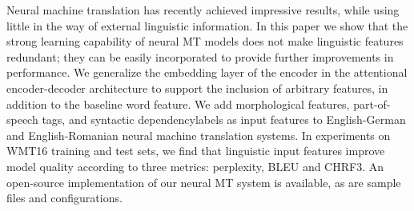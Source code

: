 Neural machine translation has recently achieved impressive results, while using little in the way of external linguistic information. In this paper we show that the strong learning capability of neural MT models does not make linguistic features redundant; they can be easily incorporated to provide further improvements in performance. We generalize the embedding layer of the encoder in the attentional encoder-decoder architecture to support the inclusion of arbitrary features, in addition to the baseline word feature. We add morphological features, part-of-speech tags, and syntactic dependencylabels as input features to English-German and English-Romanian neural machine translation systems. In experiments on WMT16 training and test sets, we find that linguistic input features improve model quality according to three metrics: perplexity, BLEU and  CHRF3. An open-source implementation of our neural MT system is available, as are sample files and configurations.
